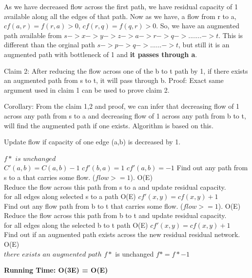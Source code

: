 	As we have decreased flow across the first path, we have residual capacity of 1 available along all the edges of that path. Now as we have, a flow from r to a, $cf(a,r) = f(r,a) > 0$, $cf(r,q) = f(q,r) > 0$. So, we have an augmented path available from $s->x->y->z->a->r->q->.......->t$. This is different than the orginal path $s->p->q->......->t$, but still it is an augmented path with bottleneck of 1 and \textbf{it passes through a}. 
	
	
	Claim 2: After reducing the flow across one of the b to t path by 1, if there exists an augmented path from s to t, it will pass through b. 
	Proof: Exact same argument used in claim 1 can be used to prove claim 2. 
	
	Corollary: From the claim 1,2  and proof, we can infer that decreasing flow of 1 across any path from s to a and decreasing flow of 1 across any path from b to t,  will find the augmented path if one exists. Algorithm is based on this. 
	
	
	
			 		
	\begin{algorithm}[H]
	\caption{Update flow if capacity of one edge (a,b) is decreased by 1.}
	\label{alg:alg_decr_by_1}
	\begin{algorithmic}
			\State $ f* $ $ is $ $ unchanged$ 	
		\EndIf
		\\
			\State $C'(a,b) = C(a,b) - 1$
			\State $cf'(b,a) = 1$	
			\State $cf'(a,b) = -1$	
			\State Find out any path from s to a that carries some flow. ($flow >=1$). O(E)\\
			\State Reduce the flow across this path from s to a and update residual capacity.\\ 
			\State for all edges along selected s to a path O(E)
				\State $cf'(x,y) = cf(x,y) + 1$		\\
			\State Find out any flow path from b to t that carries some flow. ($flow >= 1$). O(E)\\
			\State Reduce the flow across this path from b to t and update residual capacity. \\
			\State for all edges along the selected b to t path O(E) 
				\State $cf'(x,y) = cf(x,y) + 1 $ \\
			\State Find out if an augmented path exists across the new residual  residual network. O(E)\\
			\If $there $ $exists $ $an $ $augmented $ $path $
			\State $f*$ is unchanged
			\Else
			\State $f* = f* - 1$
			\EndIf	
		\EndIf
	  	
	  	
	\end{algorithmic}
	\end{algorithm}

		
	\textbf{Running Time: O(3E) = O(E)		}
	
	
					
	
	

